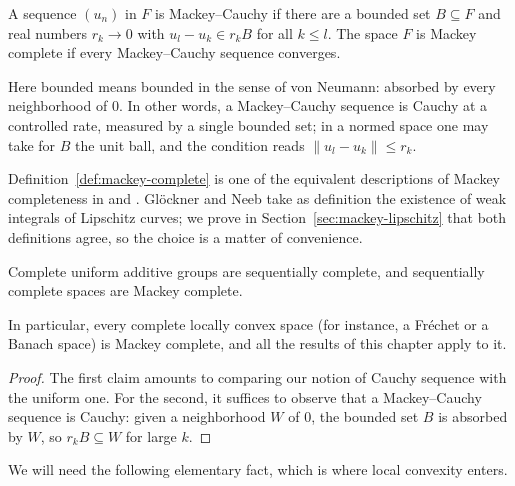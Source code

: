 \begin{definition}
  \label{def:mackey-complete}
  \leanok
  A sequence $(u_n)$ in $F$ is Mackey--Cauchy if there are a bounded set $B \subseteq F$ and
  real numbers $r_k \to 0$ with $u_l - u_k \in r_k B$ for all $k \leq l$. The space $F$ is
  Mackey complete if every Mackey--Cauchy sequence converges.
\end{definition}

Here bounded means bounded in the sense of von Neumann: absorbed by every neighborhood of $0$.
In other words, a Mackey--Cauchy sequence is Cauchy at a controlled rate, measured by a single
bounded set; in a normed space one may take for $B$ the unit ball, and the condition reads
$\|u_l - u_k\| \leq r_k$.

\begin{remark}
  Definition~\ref{def:mackey-complete} is one of the equivalent descriptions of Mackey
  completeness in \cite[1.1.18(e)]{GN26} and \cite[2.2, 2.14]{KM97}. Glöckner and Neeb take as
  definition the existence of weak integrals of Lipschitz curves; we prove in
  Section~\ref{sec:mackey-lipschitz} that both definitions agree, so the choice is a matter of
  convenience.
\end{remark}

\begin{proposition}[Comparison]
  \label{prop:completeness-chain}
  \leanok
  Complete uniform additive groups are sequentially complete, and sequentially complete spaces
  are Mackey complete.
\end{proposition}

In particular, every complete locally convex space (for instance, a Fréchet or a Banach space)
is Mackey complete, and all the results of this chapter apply to it.

\begin{proof}
  \leanok
  The first claim amounts to comparing our notion of Cauchy sequence with the uniform one. For
  the second, it suffices to observe that a Mackey--Cauchy sequence is Cauchy: given a
  neighborhood $W$ of $0$, the bounded set $B$ is absorbed by $W$, so $r_k B \subseteq W$ for
  large $k$.
\end{proof}

We will need the following elementary fact, which is where local convexity enters.

